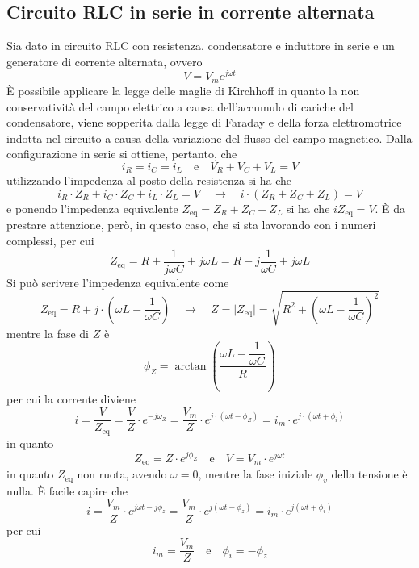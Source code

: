 \documentclass[a4paper]{extarticle}
\begin{document}
\subsection{Circuito RLC in serie in corrente alternata}
Sia dato in circuito RLC con resistenza, condensatore e induttore in serie e un generatore di corrente alternata, ovvero
\[V=V_m e^{j \omega t}\]
È possibile applicare la legge delle maglie di Kirchhoff in quanto la non conservatività del campo elettrico a causa dell'accumulo di cariche del condensatore, viene sopperita dalla legge di Faraday e della forza elettromotrice indotta nel circuito a causa della variazione del flusso del campo magnetico. Dalla configurazione in serie si ottiene, pertanto, che
\[i_R=i_C=i_L \hspace{1em} \text{e} \hspace{1em} V_R+V_C+V_L=V\]
utilizzando l'impedenza al posto della resistenza si ha che
\[i_R \cdot Z_R + i_C \cdot Z_C + i_L \cdot Z_L = V \hspace{1em} \rightarrow \hspace{1em} i \cdot \left(Z_R+Z_C+Z_L\right)=V\]
e ponendo l'impedenza equivalente $Z_\text{eq}=Z_R+Z_C+Z_L$ si ha che $i Z_\text{eq} = V$. È da prestare attenzione, però, in questo caso, che si sta lavorando con i numeri complessi, per cui
\[Z_\text{eq}=R+\dfrac{1}{j \omega C}+j\omega L=R-j \dfrac{1}{\omega C}+j\omega L\]
Si può scrivere l'impedenza equivalente come
\[Z_\text{eq} = R + j \cdot \left(\omega L - \dfrac{1}{\omega C}\right) \hspace{1em} \rightarrow \hspace{1em} Z = \vert Z_\text{eq} \vert = \sqrt{R^2 + \left(\omega L - \dfrac{1}{\omega C}\right)^2}\]
mentre la fase di $Z$ è
\[\phi_Z = \arctan \left(\dfrac{\omega L - \dfrac{1}{\omega C}}{R}\right)\]
per cui la corrente diviene
\[i=\dfrac{V}{Z_\text{eq}}=\dfrac{V}{Z} \cdot e^{-j \omega_Z} = \dfrac{V_m}{Z} \cdot e^{j \cdot (\omega t - \phi_Z)} = i_m \cdot e^{j \cdot (\omega t + \phi_i)}\]
in quanto
\[Z_{\text{eq}} = Z \cdot e^{j \phi_Z} \hspace{1em} \text{e} \hspace{1em} V=V_m \cdot e^{j \omega t}\]
in quanto $Z_\text{eq}$ non ruota, avendo $\omega=0$, mentre la fase iniziale $\phi_v$ della tensione è nulla. È facile capire che
\[i=\dfrac{V_m}{Z} \cdot e^{j\omega t - j \phi_z} = \dfrac{V_m}{Z} \cdot e^{j (\omega t - \phi_z)} = i_m \cdot e^{j (\omega t + \phi_i)}\]
per cui
\[i_m=\dfrac{V_m}{Z} \hspace{1em} \text{e} \hspace{1em} \phi_i=-\phi_z\]
\end{document}
